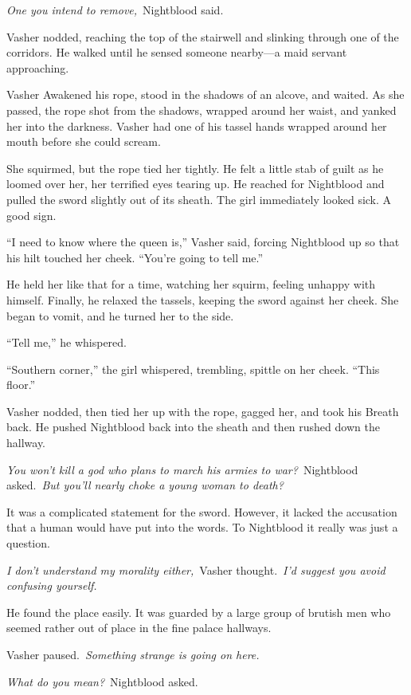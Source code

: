 \textit{One you intend to remove,}~Nightblood said.

Vasher nodded, reaching the top of the stairwell and slinking through one of the corridors. He walked until he sensed someone nearby—a maid servant approaching.

Vasher Awakened his rope, stood in the shadows of an alcove, and waited. As she passed, the rope shot from the shadows, wrapped around her waist, and yanked her into the darkness. Vasher had one of his tassel hands wrapped around her mouth before she could scream.

She squirmed, but the rope tied her tightly. He felt a little stab of guilt as he loomed over her, her terrified eyes tearing up. He reached for Nightblood and pulled the sword slightly out of its sheath. The girl immediately looked sick. A good sign.

“I need to know where the queen is,” Vasher said, forcing Nightblood up so that his hilt touched her cheek. “You’re going to tell me.”

He held her like that for a time, watching her squirm, feeling unhappy with himself. Finally, he relaxed the tassels, keeping the sword against her cheek. She began to vomit, and he turned her to the side.

“Tell me,” he whispered.

“Southern corner,” the girl whispered, trembling, spittle on her cheek. “This floor.”

Vasher nodded, then tied her up with the rope, gagged her, and took his Breath back. He pushed Nightblood back into the sheath and then rushed down the hallway.

\textit{You won’t kill a god who plans to march his armies to war?}~Nightblood asked.~\textit{But you’ll nearly choke a young woman to death?}

It was a complicated statement for the sword. However, it lacked the accusation that a human would have put into the words. To Nightblood it really was just a question.

\textit{I don’t understand my morality either,}~Vasher thought.~\textit{I’d suggest you avoid confusing yourself.}

He found the place easily. It was guarded by a large group of brutish men who seemed rather out of place in the fine palace hallways.

Vasher paused.~\textit{Something strange is going on here.}

\textit{What do you mean?}~Nightblood asked.

